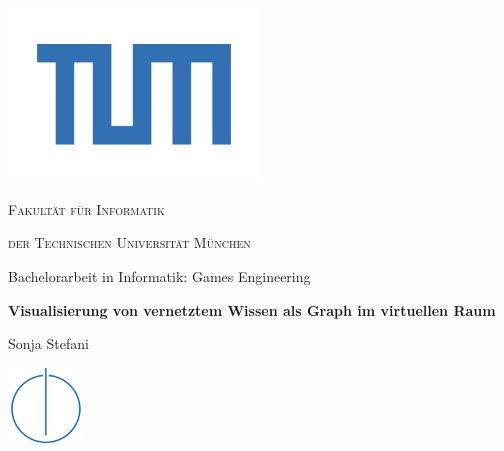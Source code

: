 \documentclass[12pt, a4paper]{article}
\begin{document}
\pagestyle{fancy}
\fancyhf{}
\renewcommand{\headrulewidth}{0pt}
\rfoot{\thepage}

\begin{titlepage}
\centering
\includegraphics[width=0.5\textwidth]{TUM_Logo.png}\par
{\scshape\LARGE Fakultät für Informatik\par}
{\scshape\Large der Technischen Universität München\par}
\vfill
{\large Bachelorarbeit in Informatik: Games Engineering\par}
\vfill
{\LARGE\bfseries Visualisierung von vernetztem Wissen als Graph im virtuellen Raum\par}
\vfill
{\large Sonja Stefani\par\vspace{1cm}}
\includegraphics[width=0.15\textwidth]{Informatik_Fakultaet_Logo.png}
\end{titlepage}
\end{document}
